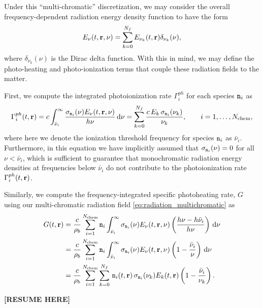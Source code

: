 \documentclass[10pt]{article}
\renewcommand{\(}{\left(}
\renewcommand{\)}{\right)}
\newcommand{\rvec}{{\bf r}}
\newcommand{\rhob}{\rho_b}
\newcommand{\Enu}{E_{\nu}}
\newcommand{\mn}{{\tt n}}
\begin{document}
Under this ``multi-chromatic'' discretization, we may consider the overall
frequency-dependent radiation energy density function to have the form
\begin{equation}
\label{eq:radiation_multichromatic}
  \Enu(t,\rvec,\nu) = \sum_{k=0}^{N_f} E_{\nu_k}(t,\rvec) \delta_{\nu_k}(\nu),
\end{equation}
where $\delta_{\nu_k}(\nu)$ is the Dirac delta function.  With this in
mind, we may define the photo-heating and photo-ionization terms that
couple these radiation fields to the matter.  

First, we compute the integrated photoionization rate $\Gamma_i^{ph}$
for each species $\mn_i$ as
\begin{equation}
\label{eq:multichromatic_photoionization}
   \Gamma_i^{ph}(t,\rvec)  = 
   c \int_{\bar{\nu}_i}^{\infty} \frac{\sigma_{\mn_i}(\nu)\Enu(t,\rvec,\nu)}{h\nu}\,\mathrm d\nu =  
   \sum_{k=0}^{N_f} \frac{c\, E_k\, \sigma_{\mn_i}(\nu_k)}{\nu_k}, \qquad i=1,\ldots,N_\text{chem},
\end{equation}
where here we denote the ionization threshold frequency for species
$\mn_i$ as $\bar{\nu}_i$.  Furthermore, in this equation we have
implicitly assumed that $\sigma_{\mn_i}(\nu) = 0$ for all $\nu <
\bar{\nu}_i$, which is sufficient to guarantee that monochromatic
radiation energy densities at frequencies below $\bar{\nu}_i$ do not
contribute to the photoionization rate $\Gamma_i^{ph}(t,\rvec)$.

Similarly, we compute the frequency-integrated specific photoheating
rate, $G$ using our multi-chromatic radiation field
\eqref{eq:radiation_multichromatic} as 
\begin{align}
\notag
   G(t,\rvec) &= 
   \frac{c}{\rhob} \sum_{i=1}^{N_\text{chem}} \mn_i
     \int_{\bar{\nu}_i}^{\infty} \sigma_{\mn_i}(\nu) \Enu(t,\rvec,\nu)
     \left(\frac{h\nu - h\bar{\nu}_i}{h\nu}\right)\,\mathrm d\nu \\
\label{eq:multichromatic_photoheating}
   &= 
   \frac{c}{\rhob} \sum_{i=1}^{N_\text{chem}} \mn_i
     \int_{\bar{\nu}_i}^{\infty} \sigma_{\mn_i}(\nu) \Enu(t,\rvec,\nu)
     \left(1 - \frac{\bar{\nu}_i}{\nu}\right)\,\mathrm d\nu \\
\notag
   &= 
   \frac{c}{\rhob} \sum_{i=1}^{N_\text{chem}} \sum_{k=0}^{N_f}\, \mn_i(t,\rvec)\,
     \sigma_{\mn_i}(\nu_k) E_k(t,\rvec) \left(1 - \frac{\bar{\nu}_i}{\nu_k}\right).
\end{align}


{\bf [RESUME HERE]}
\end{document}
